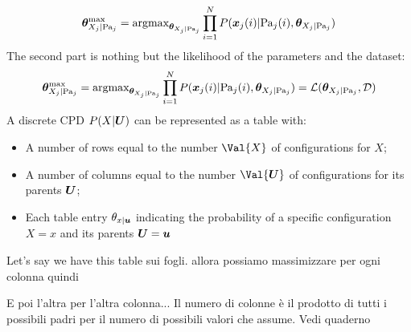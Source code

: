 \[\bm{\theta}^{\text{max}}_{X_j\vert\text{Pa}_{j}}=\text{argmax}_{\bm{\theta}_{X_j\vert \text{Pa}_{j}}}\displaystyle\prod_{i=1}^NP(\bm{x}_j(i)\vert \text{Pa}_{j}(i),\bm{\theta}_{X_j\vert\text{Pa}_{j}})\]
The second part is nothing but the likelihood of the parameters and the dataset: 
\[\bm{\theta}^{\text{max}}_{X_j\vert\text{Pa}_{j}}=\text{argmax}_{\bm{\theta}_{X_j\vert \text{Pa}_{j}}}\displaystyle\prod_{i=1}^NP(\bm{x}_j(i)\vert \text{Pa}_{j}(i),\bm{\theta}_{X_j\vert\text{Pa}_{j}})=\mathcal{L}(\bm{\theta}_{X_j\vert\text{Pa}_{j}},\mathcal{D})\]
A discrete CPD $P(X\vert \bm{U})$ can be represented as a table with:
\begin{itemize}
  \item A number of rows equal to the number $\Val{X}$ of configurations for $X$;
  \item A number of columns equal to the number $\Val{\vect{U}}$ of configurations for its parents $\bm{U}$;
  \item Each table entry $\theta_{x\vert\bm{u}}$ indicating the probability of a specific configuration $X=x$ and its parents $\bm{U}=\bm{u}$
\end{itemize}
Let's say we have this table sui fogli. allora possiamo massimizzare per ogni colonna quindi
\begin{center}
\end{center}
E poi l'altra per l'altra colonna... \newline
Il numero di colonne è il prodotto di tutti i possibili padri per il numero di possibili valori che assume. Vedi quaderno 








